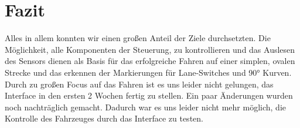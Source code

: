     	\section{Fazit}
    	
    	Alles in allem konnten wir einen großen Anteil der Ziele durchsetzten. Die Möglichkeit, alle Komponenten der Steuerung, zu kontrollieren und das Auslesen des Sensors dienen als Basis für das erfolgreiche Fahren auf einer simplen, ovalen Strecke und das erkennen der Markierungen für Lane-Switches und 90° Kurven. Durch zu großen Focus auf das Fahren ist es uns leider nicht gelungen, das Interface in den ersten 2 Wochen fertig zu stellen. Ein paar Änderungen wurden noch nachträglich gemacht. Dadurch war es uns leider nicht mehr möglich, die Kontrolle des Fahrzeuges durch das Interface zu testen.
    	 
